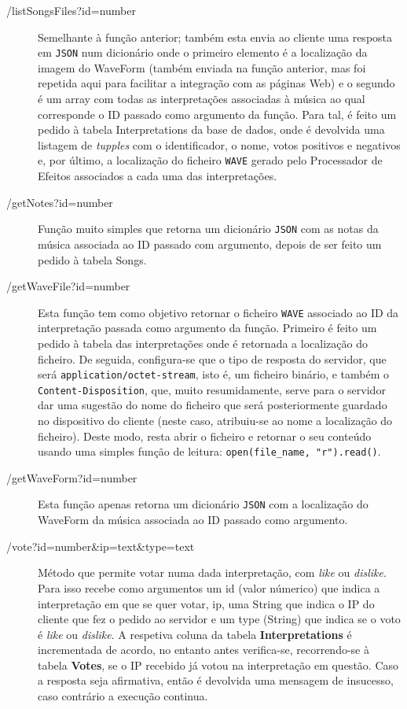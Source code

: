 \documentclass[a4paper,11pt,openright,oneside]{report}
\begin{document}
\begin{description}
\item[/listSongsFiles?id=number]
Semelhante à função anterior; também esta envia ao cliente uma resposta em \verb|JSON| num dicionário onde o primeiro elemento é a localização da imagem do WaveForm (também enviada na função anterior, mas foi repetida aqui para facilitar a integração com as páginas Web) e o segundo é um array com todas as interpretações associadas à música ao qual corresponde o ID passado como argumento da função. Para tal, é feito um pedido à tabela Interpretations da base de dados, onde é devolvida uma listagem de \textit{tupples} com o identificador, o nome, votos positivos e negativos e, por último, a localização do ficheiro \verb|WAVE| gerado pelo Processador de Efeitos associados a cada uma das interpretações.
\item[/getNotes?id=number]
Função muito simples que retorna um dicionário \verb|JSON| com as notas da música associada ao ID passado com argumento, depois de ser feito um pedido à tabela Songs.
\item[/getWaveFile?id=number]
Esta função tem como objetivo retornar o ficheiro \verb|WAVE| associado ao ID da interpretação passada como argumento da função. Primeiro é feito um pedido à tabela das interpretações onde é retornada a localização do ficheiro. De seguida, configura-se que o tipo de resposta do servidor, que será \texttt{application/octet-stream}, isto é, um ficheiro binário, e também o \texttt{Content-Disposition}, que, muito resumidamente, serve para o servidor dar uma sugestão do nome do ficheiro que será posteriormente guardado no dispositivo do cliente (neste caso, atribuiu-se ao nome a localização do ficheiro). Deste modo, resta abrir o ficheiro e retornar o seu conteúdo usando uma simples função de leitura: \texttt{open(file\_name, "r").read()}.
\item[/getWaveForm?id=number]
Esta função apenas retorna um dicionário \verb|JSON| com a localização do WaveForm da música associada ao ID passado como argumento.
\item[/vote?id=number\&ip=text\&type=text]
Método que permite votar numa dada interpretação, com \textit{like} ou \textit{dislike}. Para isso recebe como argumentos um id (valor númerico) que indica a interpretação em que se quer votar, ip, uma String que indica o IP do cliente que fez o pedido ao servidor e um type (String) que indica se o voto é \textit{like} ou \textit{dislike}. A respetiva coluna da tabela \textbf{Interpretations} é incrementada de acordo, no entanto antes verifica-se, recorrendo-se à tabela \textbf{Votes}, se o IP recebido já votou na interpretação em questão. Caso a resposta seja afirmativa, então é devolvida uma mensagem de insucesso, caso contrário a execução continua.
\end{description}
\end{document}
